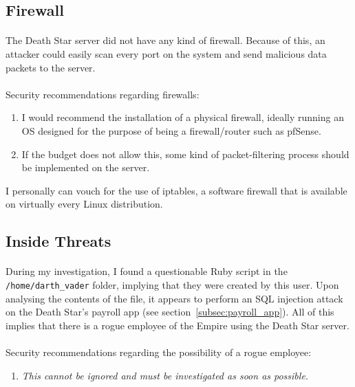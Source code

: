 \documentclass{article}
\begin{document}
\subsection{Firewall}
\label{subsec:firewall}
\paragraph{}
The Death Star server did not have any kind of firewall.
Because of this, an attacker could easily scan every port on the system and send malicious data packets to the server.

\paragraph{}
\begin{adjustwidth}{1.5cm}{1.5cm}
	Security recommendations regarding firewalls:
	\begin{enumerate}
		\item I would recommend the installation of a physical firewall, ideally running an OS designed for the purpose of being a firewall/router such as pfSense.
		\item If the budget does not allow this, some kind of packet-filtering process should be implemented on the server.
	\end{enumerate}
	I personally can vouch for the use of iptables, a software firewall that is available on virtually every Linux distribution.
\end{adjustwidth}
\subsection{Inside Threats}
\label{subsec:inside_threats}
\paragraph{}
During my investigation, I found a questionable Ruby script in the \texttt{/home/darth\_vader} folder, implying that they were created by this user.
Upon analysing the contents of the file, it appears to perform an SQL injection attack on the Death Star's payroll app (see section~\ref{subsec:payroll_app}).
All of this implies that there is a rogue employee of the Empire using the Death Star server.

\paragraph{}
\begin{adjustwidth}{1.5cm}{1.5cm}
	Security recommendations regarding the possibility of a rogue employee:
	\begin{enumerate}
		\item \emph{This cannot be ignored and must be investigated as soon as possible.} 
	\end{enumerate}
\end{adjustwidth}
\end{document}
